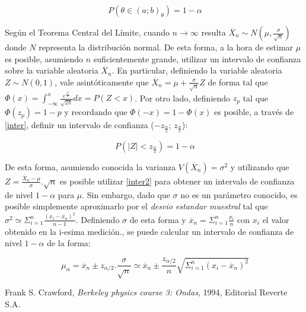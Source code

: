 \documentclass[11pt,a4paper]{article}
\begin{document}
\begin{equation}\label{inter}
\ P(\theta\in(a;b)_{\theta})= 1-\alpha
\end{equation}

Según el Teorema Central del Límite, cuando $n\rightarrow\infty$ resulta $\overline{X}_n \sim N(\mu, \frac{\sigma}{\sqrt{n}})$ donde $N$ representa la distribución normal. De esta forma, a la hora de estimar $\mu$ es posible, asumiendo $n$ suficientemente grande, utilizar un intervalo de confianza sobre la variable aleatoria $\overline{X}_n$. En particular, definiendo la variable aleatoria $Z \sim N(0,1)$, vale asintóticamente que $\overline{X}_n = \mu + \frac{\sigma}{\sqrt{n}}Z$ de forma tal que $\Phi(x) = \int_{-\infty}^x \frac{e^{\frac{x^2}{2}}}{\sqrt{2\pi}} dx = P(Z<x)$. Por otro lado, definiendo $z_{p}$ tal que $\Phi(z_{p}) = 1-p$ y recordando que $\Phi(-x) = 1-\Phi(x)$ es posible, a través de \eqref{inter}, definir un intervalo de confianza ($-z_{\frac{\alpha}{2}}$; $z_{\frac{\alpha}{2}}$):

\begin{equation}\label{inter2}
\ P(|Z|<z_{\frac{\alpha}{2}})= 1-\alpha
\end{equation}

De esta forma, asumiendo conocida la varianza $V(\overline{X}_n) = \sigma^2$ y utilizando que $Z = \frac{\overline{X}_n-\mu}{\sigma}.\sqrt{n}$ es posible utilizar \eqref{inter2} para obtener un intervalo de confianza de nivel $1-\alpha$ para $\mu$. Sin embargo, dado que $\sigma$ no es un parámetro conocido, es posible simplemente aproximarlo por el \textit{desvio estandar muestral} tal que $\sigma^2 \simeq \Sigma_{i=1}^{n}\frac{(x_i-\overline{x}_n)^2}{n-1}$. Definiendo $\sigma$ de esta forma y $\overline{x}_n = \Sigma_{i=1}^{n} \frac{x_i}{n}$ con $x_i$ el valor obtenido en la i-esima medición., se puede calcular un intervalo de confianza de nivel $1-\alpha$ de la forma:

\begin{equation}\label{inter_final}
\ \mu_{\alpha} = \overline{x}_n \pm z_{\alpha/2}.\frac{\sigma}{\sqrt{n}} \simeq \overline{x}_n \pm \frac{z_{\alpha/2}}{n} \sqrt{\Sigma_{i=1}^{n}(x_i-\overline{x}_n)^2}
\end{equation}



\begin{thebibliography}{1}
  Frank S. Crawford, \textit{Berkeley physics course 3: Ondas}, 1994, Editorial Reverte S.A.
\end{thebibliography}
 
\end{document}
